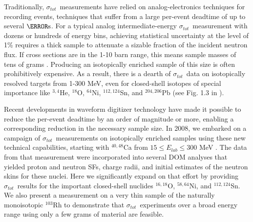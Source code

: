 \documentclass[twocolumn,secnumarabic,amssymb, nobibnotes, aps, prl,
superscriptaddress, nobalancelastpage, floatfix]{revtex4}
\newcommand{\tot}{\ensuremath{\sigma_{tot}}}
\newcommand{\oEight}{\ensuremath{^{18}}O}
\newcommand{\niFour}{\ensuremath{^{64}}N\lowercase{i}}
\newcommand{\snTwelveFour}{\ensuremath{^{112,124}}S\lowercase{n}}
\begin{document}
Traditionally, \tot\ measurements have relied on analog-electronics techniques for recording
events, techniques that suffer from a large per-event deadtime of
up to several $\micro\second$. For a typical analog intermediate-energy \tot\ measurement
with dozens or hundreds of energy bins, achieving statistical uncertainty at the
level of 1\% requires a thick sample to attenuate a sizable fraction of the
incident neutron flux. If cross sections are in the 1-10 barn range, this means
sample masses of tens of grams \cite{Finlay1993, Abfalterer2001}.
Producing an isotopically enriched sample of this size is often
prohibitively expensive. As a result, there is a dearth of \tot\ data on
isotopically resolved targets from 1-300 MeV, even for
closed-shell isotopes of special importance like $^{3,4}$He, \oEight, \niFour,
\snTwelveFour, and $^{204,206}$Pb (see Fig. 1.3 in \cite{PruittPhDThesis}).

Recent developments in waveform digitizer technology have made it
possible to reduce the per-event deadtime by an order of magnitude or more,
enabling a corresponding reduction in the necessary sample size. In 2008, we
embarked on a campaign of \tot\ measurements on isotopically enriched samples
using these new technical capabilities,
starting with $^{40,48}$Ca from $15 \leq E_{lab} \leq 300$ MeV \cite{Shane2010}.
The data from that measurement were incorporated into several
DOM analyses \cite{Mueller2011, Mahzoon2014,
MahzoonPhDThesis} that yielded proton and neutron SFs, charge
radii, and initial estimates of the neutron skins \cite{Mahzoon2017}
for these nuclei.
Here we significantly expand on that effort by providing \tot\ results for
the important closed-shell nuclides
$^{16,18}$O, $^{58,64}$Ni, and $^{112,124}$Sn. We also present a measurement
on a very thin sample of the naturally monoisotopic $^{103}$Rh to demonstrate that
\tot\ experiments over a broad energy range using only a few grams of material are feasible.
\end{document}
